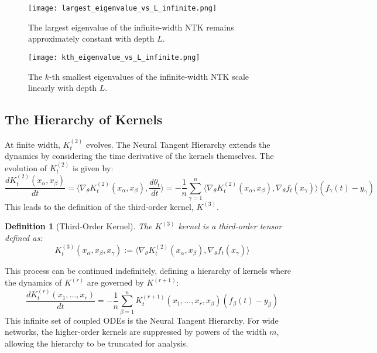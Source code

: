\documentclass{article}
\newtheorem{definition}[theorem]{Definition}
\begin{document}
\begin{figure}[h!]
    \centering
    \texttt{[image: largest\_eigenvalue\_vs\_L\_infinite.png]}
    \caption{The largest eigenvalue of the infinite-width NTK remains approximately constant with depth $L$.}
    \label{fig:largest_eigenvalue}
\end{figure}

\begin{figure}[h!]
    \centering
    \texttt{[image: kth\_eigenvalue\_vs\_L\_infinite.png]}
    \caption{The $k$-th smallest eigenvalues of the infinite-width NTK scale linearly with depth $L$.}
    \label{fig:k_eigenvalue}
\end{figure}

\subsection{The Hierarchy of Kernels}
At finite width, $K^{(2)}_t$ evolves. The Neural Tangent Hierarchy extends the dynamics by considering the time derivative of the kernels themselves. The evolution of $K^{(2)}_t$ is given by:
\begin{equation}
\frac{d K^{(2)}_t(x_\alpha, x_\beta)}{dt} = \langle \nabla_\theta K^{(2)}_t(x_\alpha, x_\beta), \frac{d\theta_t}{dt} \rangle = -\frac{1}{n} \sum_{\gamma=1}^n \langle \nabla_\theta K^{(2)}_t(x_\alpha, x_\beta), \nabla_\theta f_t(x_\gamma) \rangle (f_\gamma(t) - y_\gamma)
\end{equation}
This leads to the definition of the third-order kernel, $K^{(3)}$.

\begin{definition}[Third-Order Kernel]
The $K^{(3)}$ kernel is a third-order tensor defined as:
\begin{equation}
K^{(3)}_t(x_\alpha, x_\beta, x_\gamma) := \langle \nabla_\theta K^{(2)}_t(x_\alpha, x_\beta), \nabla_\theta f_t(x_\gamma) \rangle
\end{equation}
\end{definition}

This process can be continued indefinitely, defining a hierarchy of kernels where the dynamics of $K^{(r)}$ are governed by $K^{(r+1)}$:
\begin{equation}
\frac{dK_t^{(r)}(x_1, \dots, x_r)}{dt} = -\frac{1}{n} \sum_{\beta=1}^n K^{(r+1)}_t(x_1, \dots, x_r, x_\beta)(f_\beta(t)-y_\beta)
\end{equation}
This infinite set of coupled ODEs is the Neural Tangent Hierarchy. For wide networks, the higher-order kernels are suppressed by powers of the width $m$, allowing the hierarchy to be truncated for analysis.
\end{document}
